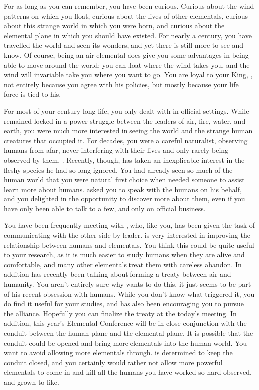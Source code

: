 \documentclass[char]{elementals}
\begin{document}
\name{\cNaturalist{}}

For as long as you can remember, you have been curious.  Curious about the wind patterns on which you float, curious about the lives of other elementals, curious about this strange world in which you were born, and curious about the elemental plane in which you should have existed.  For nearly a century, you have travelled the world and seen its wonders, and yet there is still more to see and know.  Of course, being an air elemental does give you some advantages in being able to move around the world; you can float where the wind takes you, and the wind will invariable take you where you want to go.  You are loyal to your King, \cKing{\intro}, not entirely because you agree with his policies, but mostly because your life force is tied to his.

For most of your century-long life, you only dealt with \cKing{} in official settings.  While \cKing{} remained locked in a power struggle between the leaders of air, fire, water, and earth, you were much more interested in seeing the world and the strange human creatures that occupied it.  For decades, you were a careful naturalist, observing humans from afar, never interfering with their lives and only rarely being observed by them.  .  Recently, though, \cKing{} has taken an inexplicable interest in the fleshy species he had so long ignored.  You had already seen so much of the human world that you were \cKing{\their} natural first choice when \cKing{\they} needed someone to assist \cKing{\them} learn more about humans.  \cKing{\They} asked you to speak with the humans on his behalf, and you delighted in the opportunity to discover more about them, even if you have only been able to talk to a few, and only on official business.

You have been frequently meeting with \cDiplomat{\intro}, who, like you, has been given the task of communicating with the other side by \cDiplomat{\their} leader.   is very interested in improving the relationship between humans and elementals.  You think this could be quite useful to your research, as it is much easier to study humans when they are alive and comfortable, and many other elementals treat them with careless abandon.  In addition \cKing{} has recently been talking about forming a treaty between air and humanity.  You aren't entirely sure why \cKing{\they} wants to do this, it just seems to be part of his recent obsession with humans.  While you don't know what triggered it, you do find it useful for your studies, and \cDiplomat{} has also been encouraging you to pursue the alliance.  Hopefully you can finalize the treaty at the today's meeting.  In addition, this year's Elemental Conference will be in close conjunction with the conduit between the human plane and the elemental plane.  It is possible that the conduit could be opened and bring more elementals into the human world.  You want to avoid allowing more elementals through.  \cKing{} is determined to keep the conduit closed, and you certainly would rather not allow more powerful elementals to come in and kill all the humans you have worked so hard observed, and grown to like.
\end{document}
